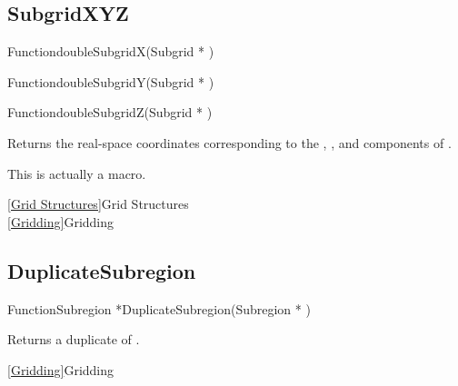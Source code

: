 
\newpage
\subsection{SubgridXYZ}
\label{SubgridXYZ}


\begin{deftypefn}{Function}{double}{SubgridX}({Subgrid *} )
\end{deftypefn}
\begin{deftypefn}{Function}{double}{SubgridY}({Subgrid *} )
\end{deftypefn}
\begin{deftypefn}{Function}{double}{SubgridZ}({Subgrid *} )

\DESCRIPTION
Returns the real-space coordinates corresponding to the
, , and  components of .

\NOTES
This is actually a macro.

\SEEALSO
\vref{Grid Structures}{Grid Structures}\\
\vref{Gridding}{Gridding}

\end{deftypefn}


\newpage
\subsection{DuplicateSubregion}
\label{DuplicateSubregion}


\begin{deftypefn}{Function}{Subregion *}{DuplicateSubregion}({Subregion *} )

\DESCRIPTION
Returns a duplicate of .

\SEEALSO
\vref{Gridding}{Gridding}

\end{deftypefn}

